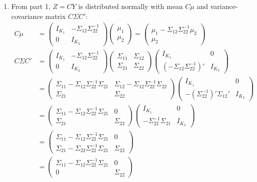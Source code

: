 \documentclass{article}[12pt]
\begin{document}
\begin{enumerate}
		\item From part 1, $Z = CY$ is distributed normally with mean $C \mu$ and variance-covariance matrix $C \Sigma C'$:
		\begin{align*}
			C \mu &=
				\begin{pmatrix} I_{K_1} & -\Sigma_{12}\Sigma_{22}^{-1} \\ 0 & I_{K_2} \end{pmatrix}
				\begin{pmatrix} \mu_1 \\ \mu_2 \end{pmatrix}
			= \begin{pmatrix} \mu_1 - \Sigma_{12} \Sigma_{22}^{-1} \mu_2 \\ \mu_2 \end{pmatrix} \\
			C \Sigma C' &=
				\begin{pmatrix} I_{K_1} & -\Sigma_{12}\Sigma_{22}^{-1} \\ 0 & I_{K_2} \end{pmatrix}
				\begin{pmatrix} \Sigma_{11} &\Sigma_{12} \\ \Sigma_{21} & \Sigma_{22} \end{pmatrix}
				\begin{pmatrix} I_{K_1} & 0 \\ (-\Sigma_{12}\Sigma_{22}^{-1})' & I_{K_2} \end{pmatrix} \\
			&=	\begin{pmatrix} \Sigma_{11} - \Sigma_{12}\Sigma_{22}^{-1}\Sigma_{21} & \Sigma_{12} - \Sigma_{12}\Sigma_{22}^{-1} \Sigma_{22} \\ \Sigma_{21} & \Sigma_{22} \end{pmatrix}
				\begin{pmatrix} I_{K_1} & 0 \\ -(\Sigma_{22}^{-1})' \Sigma_{12}' & I_{K_2} \end{pmatrix} \\
			&=	\begin{pmatrix} \Sigma_{11} - \Sigma_{12}\Sigma_{22}^{-1}\Sigma_{21} & 0 \\ \Sigma_{21} & \Sigma_{22} \end{pmatrix}
				\begin{pmatrix} I_{K_1} & 0 \\ -\Sigma_{22}^{-1} \Sigma_{21} & I_{K_2} \end{pmatrix} \\
			&=	\begin{pmatrix} \Sigma_{11} - \Sigma_{12}\Sigma_{22}^{-1}\Sigma_{21} & 0 \\ \Sigma_{21} - \Sigma_{22}\Sigma_{22}^{-1}\Sigma_{21} & \Sigma_{22} \end{pmatrix} \\
			&=	\begin{pmatrix} \Sigma_{11} - \Sigma_{12}\Sigma_{22}^{-1}\Sigma_{21} & 0 \\ 0 & \Sigma_{22} \end{pmatrix}
		\end{align*}


\end{enumerate}
\end{document}
